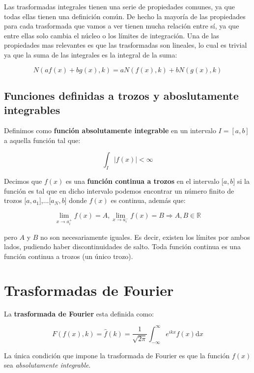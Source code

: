 \documentclass[12pt]{book}
\newcommand{\D}{\mathrm{d}}
\newcommand{\inti}{\int_{-\infty}^{\infty}}
\newcommand{\hatf}{\widehat{f}}
\begin{document}
Las trasformadas integrales tienen una serie de propiedades comunes, ya que todas ellas tienen una definición común. De hecho la mayoría de las propiedades para cada trasformada que vamos a ver tienen mucha relación entre sí, ya que entre ellas solo cambia el núcleo o los límites de integración. Una de las propiedades mas relevantes es que las trasformadas son lineales, lo cual es trivial ya que la suma de las integrales es la integral de la suma:

\begin{equation}
N(a f(x) + b g(x),k) = a N(f(x),k) + b N(g(x),k)
\end{equation}


\subsection{Funciones definidas a trozos y aboslutamente integrables}

Definimos como \textbf{función absolutamente integrable} en un intervalo $I=[a,b]$ a aquella función tal que:

\begin{equation}
\int_I |f(x)| < \infty
\end{equation}

Decimos que $f(x)$ es una \textbf{función continua a trozos} en el intervalo [$a,b$] si la función es tal que en dicho intervalo podemos encontrar un número finito de trozos [$a,a_1$],...[$a_N,b$] donde $f(x)$ es continua, además que:


$$ \lim_{x \rightarrow a_i^+} f(x) = A, \lim_{x \rightarrow a_i^-} f(x) = B \Longrightarrow A,B \in \mathbb{R}   $$

pero $A$ y $B$ no son necesariamente iguales. Es decir, existen los límites por ambos lados, pudiendo haber discontinuidades de salto. Toda función continua es una función continua a trozos (un único trozo).

\section{Trasformadas de Fourier}

La \textbf{trasformada de Fourier} esta definida como:

\begin{equation}
F(f(x),k) = \hatf(k) = \dfrac{1}{\sqrt{2 \pi}} \inti e^{ikx} f(x) \D x
\end{equation}

La única condición que impone la trasformada de Fourier es que la función $f(x)$ sea \textit{absolutamente integrable}. \\
\end{document}

